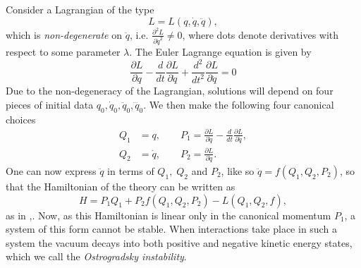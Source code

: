 Consider a Lagrangian of the type
\[
L=L(q,{\dot q},{\ddot q})
,\]
which is \emph{non-degenerate} on ${\ddot q}$, i.e. $\frac{\partial^2 L}{\partial {\ddot q}^2}\neq 0$, where dots denote derivatives with respect to some parameter $\lambda$. The Euler Lagrange equation is given by
\[
\frac{\partial L}{\partial q}-\frac{d}{dt}\frac{\partial L}{\partial {\dot q}}+\frac{d^2}{dt^2}\frac{\partial L}{\partial {\ddot q}}=0
\]
Due to the non-degeneracy of the Lagrangian, solutions will depend on four pieces of initial data $q_0,{\dot q_0},{\ddot q_0},{\dddot q}_0$. We then make the following four canonical choices 
\begin{align}
Q_1&=q,\qquad P_1=\frac{\partial L}{\partial {\dot q}}-\frac{d}{dt}\frac{\partial L}{\partial {\ddot q}}
,\\
 Q_2&={\dot q},\qquad P_2=\frac{\partial L}{\partial {\ddot q}}
.
\end{align}
One can now express ${\ddot q}$ in terms of $Q_1,\;Q_2$ and $P_2$, like so ${\ddot q}=f(Q_1,Q_2,P_2)$, so that the Hamiltonian of the theory can be written as
\[
H=P_1Q_1+P_2f(Q_1,Q_2,P_2)-L(Q_1,Q_2,f)
,\]
as in \cite{Clifton:2011jh},\cite{Woodard:2015zca}. Now, as this Hamiltonian is linear only in the canonical momentum $P_1$, a system of this form cannot be stable. When interactions take place in such a system the vacuum decays into both positive and negative kinetic energy states, which we call the \emph{Ostrogradsky instability}.

